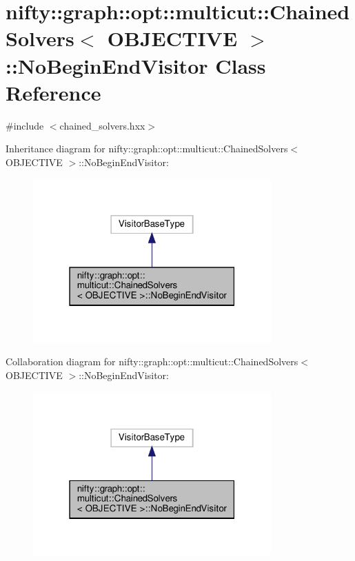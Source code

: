 \hypertarget{classnifty_1_1graph_1_1opt_1_1multicut_1_1ChainedSolvers_1_1NoBeginEndVisitor}{}\section{nifty\+:\+:graph\+:\+:opt\+:\+:multicut\+:\+:Chained\+Solvers$<$ O\+B\+J\+E\+C\+T\+I\+VE $>$\+:\+:No\+Begin\+End\+Visitor Class Reference}
\label{classnifty_1_1graph_1_1opt_1_1multicut_1_1ChainedSolvers_1_1NoBeginEndVisitor}


{\ttfamily \#include $<$chained\+\_\+solvers.\+hxx$>$}



Inheritance diagram for nifty\+:\+:graph\+:\+:opt\+:\+:multicut\+:\+:Chained\+Solvers$<$ O\+B\+J\+E\+C\+T\+I\+VE $>$\+:\+:No\+Begin\+End\+Visitor\+:
\nopagebreak
\begin{figure}[H]
\begin{center}
\leavevmode
\includegraphics[width=259pt]{classnifty_1_1graph_1_1opt_1_1multicut_1_1ChainedSolvers_1_1NoBeginEndVisitor__inherit__graph}
\end{center}
\end{figure}


Collaboration diagram for nifty\+:\+:graph\+:\+:opt\+:\+:multicut\+:\+:Chained\+Solvers$<$ O\+B\+J\+E\+C\+T\+I\+VE $>$\+:\+:No\+Begin\+End\+Visitor\+:
\nopagebreak
\begin{figure}[H]
\begin{center}
\leavevmode
\includegraphics[width=259pt]{classnifty_1_1graph_1_1opt_1_1multicut_1_1ChainedSolvers_1_1NoBeginEndVisitor__coll__graph}
\end{center}
\end{figure}
